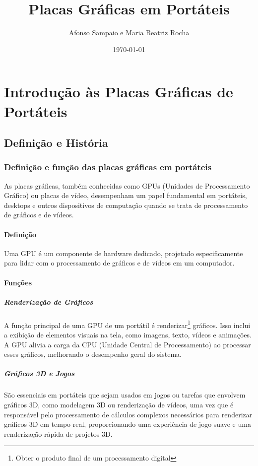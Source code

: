 \documentclass[a4paper,11pt,]{report}
\title{\textbf{\Huge{Placas Gráficas em Portáteis}}}
\author{Afonso Sampaio e Maria Beatriz Rocha}
\date\today
\begin{document}
\maketitle

\tableofcontents

\part{Introdução às Placas Gráficas de Portáteis}

\chapter{Definição e História}

\section{Definição e função das placas gráficas em portáteis}
As placas gráficas, também conhecidas como GPUs (Unidades de Processamento Gráfico) ou placas de vídeo, desempenham um papel fundamental em portáteis, desktops e outros dispositivos de computação quando se trata de processamento de gráficos e de vídeos.
\subsection{Definição}
Uma GPU é um componente de hardware dedicado, projetado especificamente para lidar com o processamento de gráficos e de vídeos em um computador. 
\subsection{Funções}
\subsubsection{Renderização de Gráficos}
A função principal de uma GPU de um portátil é renderizar\footnote{Obter o produto final de um processamento digital} gráficos. Isso inclui a exibição de elementos visuais na tela, como imagens, texto, vídeos e animações. A GPU alivia a carga da CPU (Unidade Central de Processamento) ao processar esses gráficos, melhorando o desempenho geral do sistema.
\pagebreak
\subsubsection{Gráficos 3D e Jogos}
São essenciais em portáteis que sejam usados em jogos ou tarefas que envolvem gráficos 3D, como modelagem 3D ou renderização de vídeos, uma vez que é responsável pelo processamento de cálculos complexos necessários para renderizar gráficos 3D em tempo real, proporcionando uma experiência de jogo suave e uma renderização rápida de projetos 3D.
\end{document}

